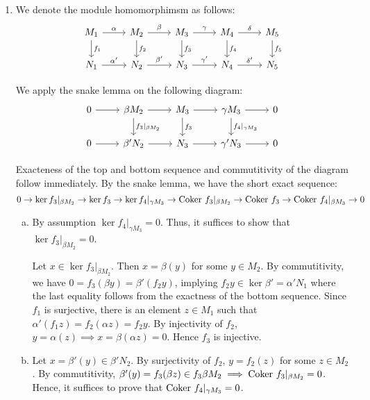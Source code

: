 \documentclass{article}
\theoremstyle{definition}
\theoremstyle{remark}
\begin{document}
\begin{enumerate}[(1)]
  \item We denote the module homomorphimsm as follows:
                \[\begin{tikzcd}
          {M_1} & {M_2} & {M_3} & {M_4} & {M_5} \\
          {N_1} & {N_2} & {N_3} & {N_4} & {N_5}
          \arrow["\alpha", from=1-1, to=1-2]
          \arrow["{f_1}", from=1-1, to=2-1]
          \arrow["\beta", from=1-2, to=1-3]
          \arrow["{f_2}", from=1-2, to=2-2]
          \arrow["\gamma", from=1-3, to=1-4]
          \arrow["{f_3}", from=1-3, to=2-3]
          \arrow["\delta", from=1-4, to=1-5]
          \arrow["{f_4}", from=1-4, to=2-4]
          \arrow["{f_5}", from=1-5, to=2-5]
          \arrow["{\alpha'}", from=2-1, to=2-2]
          \arrow["{\beta'}", from=2-2, to=2-3]
          \arrow["{\gamma'}", from=2-3, to=2-4]
          \arrow["{\delta'}", from=2-4, to=2-5]
        \end{tikzcd}\]

        We apply the snake lemma on the following diagram:
        \[\begin{tikzcd}
          0 & {\beta M_2 } & {M_3} & {\gamma M_3} & 0 \\
          0 & {\beta' N_2} & {N_3} & {\gamma' N_3} & 0
          \arrow[from=1-1, to=1-2]
          \arrow[from=1-2, to=1-3]
          \arrow["{f_3|_{\beta M_2}}", from=1-2, to=2-2]
          \arrow[from=1-3, to=1-4]
          \arrow["{f_3}", from=1-3, to=2-3]
          \arrow[from=1-4, to=1-5]
          \arrow["{f_4|_{\gamma M_3}}", from=1-4, to=2-4]
          \arrow[from=2-1, to=2-2]
          \arrow[from=2-2, to=2-3]
          \arrow[from=2-3, to=2-4]
          \arrow[from=2-4, to=2-5]
        \end{tikzcd}\]


        Exacteness  of the top and bottom sequence and commutitivity of the diagram follow immediately. By the snake lemma, we have the short exact sequence:
      $$0 \to \ker f_3|_{\beta M_2} \to \ker f_3 \to \ker f_4|_{\gamma M_3} \to \mathrm{Coker\ } f_3|_{\beta M_2} \to \mathrm{Coker\ } f_3 \to \mathrm{Coker\ } f_4|_{\beta M_3} \to 0 $$
        \begin{enumerate}[(a)]
          \item

                By assumption $\ker f_4|_{\gamma M_3} = 0$. Thus, it suffices to show that $\ker f_3|_{\beta M_2} = 0$.

                Let $x \in \ker f_3|_{\beta M_2}$. Then $x = \beta(y)$ for some $y \in M_2$. By commutitivity, we have $0 = f_3(\beta y) = \beta'(f_2 y)$, implying $f_2y \in \ker \beta' =  \alpha' N_1$ where the last equality follows from the exactness of the bottom sequence. Since $f_1$ is surjective, there is an element $z \in M_1$ such that $\alpha' (f_1z) = f_2 (\alpha z) = f_2 y.$ By injectivity of $f_2$, $y = \alpha(z) \implies x = \beta(\alpha z) = 0$. Hence $f_3$ is injective.
          \item
                Let $x = \beta'(y) \in \beta' N_2$. By surjectivity of $f_2$, $y = f_2(z)$ for some $z \in M_2$. By commutitivity, $\beta'(y) = f_3(\beta z) \in f_3\beta M_2 \implies \mathrm{Coker\ } f_3|_{\beta M_2} = 0$. Hence, it suffices to prove that $\mathrm{Coker\ } f_4|_{\gamma M_3} = 0$.


\end{enumerate}
\end{enumerate}
\end{document}
